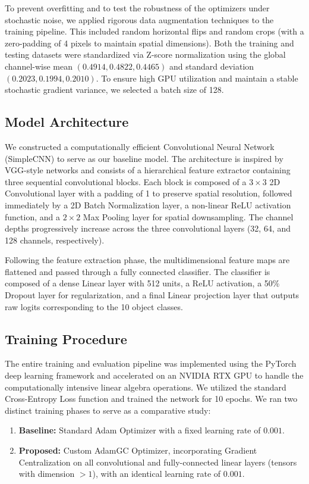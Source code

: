 \documentclass[conference]{IEEEtran}
\begin{document}
To prevent overfitting and to test the robustness of the optimizers under stochastic noise, we applied rigorous data augmentation techniques to the training pipeline. This included random horizontal flips and random crops (with a zero-padding of 4 pixels to maintain spatial dimensions). Both the training and testing datasets were standardized via Z-score normalization using the global channel-wise mean $(0.4914, 0.4822, 0.4465)$ and standard deviation $(0.2023, 0.1994, 0.2010)$. To ensure high GPU utilization and maintain a stable stochastic gradient variance, we selected a batch size of 128.

\subsection{Model Architecture}
We constructed a computationally efficient Convolutional Neural Network (SimpleCNN) to serve as our baseline model. The architecture is inspired by VGG-style networks and consists of a hierarchical feature extractor containing three sequential convolutional blocks. Each block is composed of a $3 \times 3$ 2D Convolutional layer with a padding of 1 to preserve spatial resolution, followed immediately by a 2D Batch Normalization layer, a non-linear ReLU activation function, and a $2 \times 2$ Max Pooling layer for spatial downsampling. The channel depths progressively increase across the three convolutional layers (32, 64, and 128 channels, respectively). 

Following the feature extraction phase, the multidimensional feature maps are flattened and passed through a fully connected classifier. The classifier is composed of a dense Linear layer with 512 units, a ReLU activation, a 50\% Dropout layer for regularization, and a final Linear projection layer that outputs raw logits corresponding to the 10 object classes.

\subsection{Training Procedure}
The entire training and evaluation pipeline was implemented using the PyTorch deep learning framework \cite{paszke2019pytorch} and accelerated on an NVIDIA RTX GPU to handle the computationally intensive linear algebra operations. We utilized the standard Cross-Entropy Loss function and trained the network for 10 epochs. We ran two distinct training phases to serve as a comparative study:
\begin{enumerate}
    \item \textbf{Baseline:} Standard Adam Optimizer with a fixed learning rate of $0.001$.
    \item \textbf{Proposed:} Custom AdamGC Optimizer, incorporating Gradient Centralization on all convolutional and fully-connected linear layers (tensors with dimension $> 1$), with an identical learning rate of $0.001$.
\end{enumerate}
\end{document}
